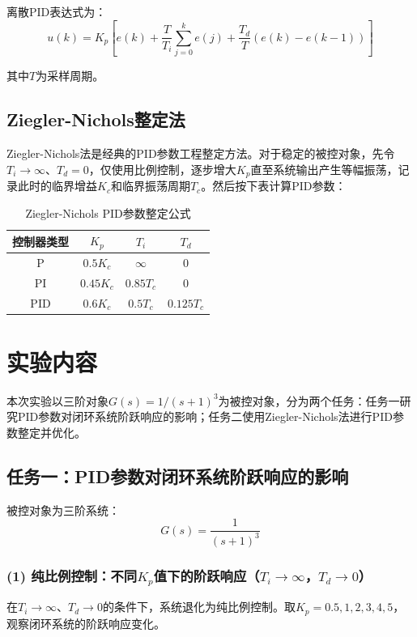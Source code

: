 \documentclass{../common/SCNU_Experimental_Report}
\begin{document}
离散PID表达式为：
\[
u(k) = K_p \left[ e(k) + \frac{T}{T_i}\sum_{j=0}^{k} e(j) + \frac{T_d}{T}\left(e(k) - e(k-1)\right) \right]
\]

其中\(T\)为采样周期。

\subsection{Ziegler-Nichols整定法}

Ziegler-Nichols法是经典的PID参数工程整定方法。对于稳定的被控对象，先令\(T_i \to \infty\)、\(T_d = 0\)，仅使用比例控制，逐步增大\(K_p\)直至系统输出产生等幅振荡，记录此时的临界增益\(K_c\)和临界振荡周期\(T_c\)。然后按下表计算PID参数：

\begin{table}[H]
    \centering
    \caption{Ziegler-Nichols PID参数整定公式}
    \label{tab:zn}
    \small
    \begin{tabular}{cccc}
        \toprule
        控制器类型 & \(K_p\) & \(T_i\) & \(T_d\) \\
        \midrule
        P & \(0.5 K_c\) & \(\infty\) & 0 \\
        PI & \(0.45 K_c\) & \(0.85 T_c\) & 0 \\
        PID & \(0.6 K_c\) & \(0.5 T_c\) & \(0.125 T_c\) \\
        \bottomrule
    \end{tabular}
\end{table}

\section{实验内容}

本次实验以三阶对象\(G(s) = 1/(s+1)^3\)为被控对象，分为两个任务：任务一研究PID参数对闭环系统阶跃响应的影响；任务二使用Ziegler-Nichols法进行PID参数整定并优化。

\subsection{任务一：PID参数对闭环系统阶跃响应的影响}

被控对象为三阶系统：
\[
G(s) = \frac{1}{(s+1)^3}
\]

\subsubsection{(1) 纯比例控制：不同\(K_p\)值下的阶跃响应（\(T_i \to \infty\)，\(T_d \to 0\)）}

在\(T_i \to \infty\)、\(T_d \to 0\)的条件下，系统退化为纯比例控制。取\(K_p = 0.5, 1, 2, 3, 4, 5\)，观察闭环系统的阶跃响应变化。
\end{document}
